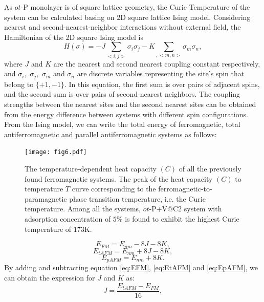 \documentclass[%
superscriptaddress,
preprint,
showpacs,preprintnumbers,
 amsmath,amssymb,
prb,
]{revtex4-1}
\begin{document}
As $ot$-P monolayer is of square lattice geometry, the Curie Temperature
of the system can be calculated basing on 2D square lattice Ising
model. Considering nearest and second-nearest-neighbor interactions
without external field, the Hamiltonian of the 2D square Ising model
is
\begin{equation}
H(\sigma)=-J\sum_{<i,j>}\sigma_{i}\sigma_{j}-K\sum_{,<m,n>}\sigma_{m}\sigma_{n},\label{eq:ising model}
\end{equation}
where $J$ and $K$ are the nearest and second nearest coupling constant
respectively, and $\sigma_{i},$ $\sigma_{j},$ $\sigma_{m}$ and
$\sigma_{n}$ are discrete variables representing the site's spin
that belong to $\{+1,-1\}$. In this equation, the first sum is over
pairs of adjacent spins, and the second sum is over pairs of second-nearest
neighbors. The coupling strengths between the nearest sites and the
second nearest sites can be obtained from the energy difference between
systems with different spin configurations. From the Ising model, we can
write the total energy of ferromagnetic, total antiferromagnetic and
parallel antiferromagnetic systems as follows:


\begin{figure}[ptb]
\centering
\texttt{[image: fig6.pdf]}
\caption{{\footnotesize{}The temperature-dependent heat capacity $(C)$ of
all the previously found ferromagnetic systems. The peak of the heat
capacity $(C)$ to temperature $T$ curve corresponding to the ferromagnetic-to-paramagnetic
phase transition temperature, i.e. the Curie temperature. Among all
the systems, $ot$-P+V@C2 system with adsorption concentration of $5\%$
is found to exhibit the highest Curie temperature of 173K. \label{fig:T-dependent-C}}}
\end{figure}


\begin{equation}
E_{FM}=E_{nm}-8J-8K,\label{eq:EFM}
\end{equation}
\begin{equation}
E_{tAFM}=E_{nm}+8J-8K,\label{eq:EtAFM}
\end{equation}
\begin{equation}
E_{pAFM}=E_{nm}+8K.\label{eq:EpAFM}
\end{equation}
By adding and subtracting equation \ref{eq:EFM}, \ref{eq:EtAFM}
and \ref{eq:EpAFM}, we can obtain the expression for $J$ and $K$
as:
\begin{equation}
J=\frac{E_{tAFM}-E_{FM}}{16},\label{eq:J}
\end{equation}
\end{document}
